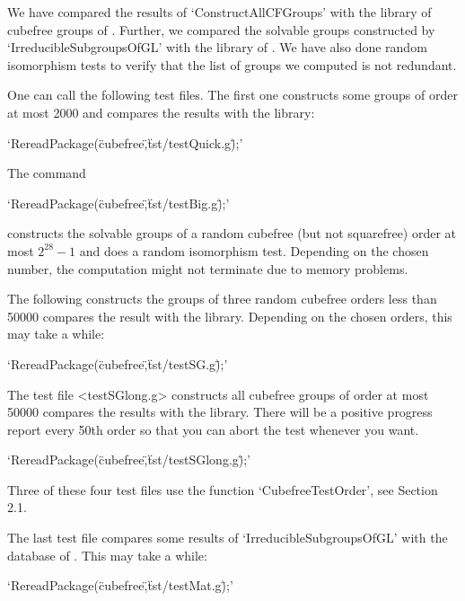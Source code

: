 
We have compared the results of `ConstructAllCFGroups' with the library of
cubefree groups of {\SmallGroups}. Further, we compared the 
solvable groups constructed by `IrreducibleSubgroupsOfGL' with the library of
{\IrredSol}. We have also done random isomorphism tests to verify that the
list of groups we computed is not redundant. 

One can call the following test files. The first one constructs some groups of order at most 2000 and compares the results with the
{\SmallGroups} library:


`RereadPackage(\"cubefree\",\"tst/testQuick.g\");'


The command

`RereadPackage(\"cubefree\",\"tst/testBig.g\");'

constructs the solvable groups of a random cubefree (but not squarefree) order at most $2^{28}-1$ and does a random isomorphism test. Depending on the chosen number, the computation might not terminate due to memory problems.



The following constructs the groups of three random cubefree orders less than 50000 compares the result with the
{\SmallGroups} library. Depending on the chosen orders, this may take a while:

`RereadPackage(\"cubefree\",\"tst/testSG.g\");'


The test file <testSGlong.g> constructs all cubefree groups of order at most
50000 compares the results with the
{\SmallGroups} library. There will be a positive progress report every 50th
order so that you can abort the test whenever you want.

`RereadPackage(\"cubefree\",\"tst/testSGlong.g\");'

Three of these four test files use the function `CubefreeTestOrder', see Section 2.1. 

The last test file compares some results of `IrreducibleSubgroupsOfGL' with the
database of {\IrredSol}. This may take a while:

`RereadPackage(\"cubefree\",\"tst/testMat.g\");'






